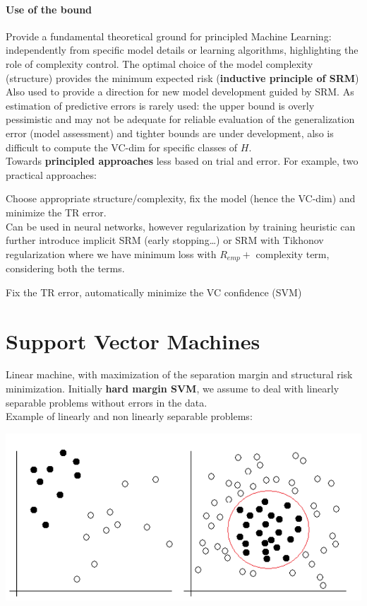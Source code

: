 \documentclass[10pt]{report}
\begin{document}
\paragraph{Use of the bound} Provide a fundamental theoretical ground for principled Machine Learning: independently from specific model details or learning algorithms, highlighting the role of complexity control. The optimal choice of the model complexity (structure) provides the minimum expected risk (\textbf{inductive principle of SRM})\\
Also used to provide a direction for new model development guided by SRM. As estimation of predictive errors is rarely used: the upper bound is overly pessimistic and may not be adequate for reliable evaluation of the generalization error (model assessment) and tighter bounds are under development, also is difficult to compute the VC-dim for specific classes of $H$.\\
Towards \textbf{principled approaches} less based on trial and error. For example, two practical approaches:
\begin{list}{}{}
	\item Choose appropriate structure/complexity, fix the model (hence the VC-dim) and minimize the TR error.\\
	Can be used in neural networks, however regularization by training heuristic can further introduce implicit SRM (early stopping\ldots) or SRM with Tikhonov regularization where we have minimum loss with $R_{emp} +$ complexity term, considering both the terms.
	\item Fix the TR error, automatically minimize the VC confidence (SVM)
\end{list}
\section{Support Vector Machines}
Linear machine, with maximization of the separation margin and structural risk minimization. Initially \textbf{hard margin SVM}, we assume to deal with linearly separable problems without errors in the data.\\
Example of linearly and non linearly separable problems:
\begin{center}
	\includegraphics[scale=0.5]{17.png}
\end{center}
\end{document}
